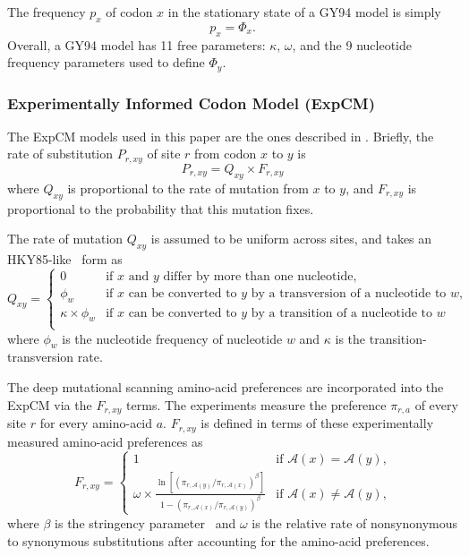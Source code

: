 \documentclass[11pt]{article}
\begin{document}
The frequency $p_x$ of codon $x$ in the stationary state of a GY94 model is simply 
\begin{equation}
\label{eq:px}
p_{x} = \Phi_x.
\end{equation}
Overall, a GY94 model has 11 free parameters: $\kappa$, $\omega$, and the 9 nucleotide frequency parameters used to define $\Phi_y$. 

\subsubsection*{Experimentally Informed Codon Model (ExpCM)}

The ExpCM models used in this paper are the ones described in \citet{bloom2017identification}. 
Briefly, the rate of substitution $P_{r,xy}$ of site $r$ from codon $x$ to $y$ is 
\begin{equation}
\label{eq:ExpCM}
P_{r,xy} = Q_{xy} \times F_{r,xy}
\end{equation}
where $Q_{xy}$ is proportional to the rate of mutation from $x$ to $y$, and $F_{r,xy}$ is proportional to the probability that this mutation fixes.

The rate of mutation $Q_{xy}$ is assumed to be uniform across sites, and takes an HKY85-like~\citep{hasegawa1985dating} form as 
\begin{equation}
\label{eq:Qxy}
   Q_{xy} = \begin{cases}
            0 & \mbox{if $x$ and $y$ differ by more than one nucleotide,} \\
            \phi_w & \mbox{if $x$ can be converted to $y$ by a transversion of a nucleotide to $w$,} \\
            \kappa \times \phi_w & \mbox{if $x$ can be converted to $y$ by a transition of a nucleotide to $w$} \\
            \end{cases}
\end{equation}
where $\phi_w$ is the nucleotide frequency of nucleotide $w$ and $\kappa$ is the transition-transversion rate.


The deep mutational scanning amino-acid preferences are incorporated into the ExpCM via the $F_{r,xy}$ terms.
The experiments measure the preference $\pi_{r,a}$ of every site $r$ for every amino-acid $a$.
$F_{r,xy}$ is defined in terms of these experimentally measured amino-acid preferences as
\begin{equation}
\label{eq:Frxy}
F_{r,xy} = 
\begin{cases}
   1 & \mbox{if $\mathcal{A}\left(x\right) = \mathcal{A}\left(y\right)$,} \\
   \omega \times \frac{\ln\left[\left(\pi_{r,\mathcal{A}\left(y\right)} / \pi_{r,\mathcal{A}\left(x\right)}\right)^{\beta}\right]}{1 - \left(\pi_{r,\mathcal{A}\left(x\right)} / \pi_{r,\mathcal{A}\left(y\right)}\right)^{\beta}} & \mbox{if $\mathcal{A}\left(x\right) \ne \mathcal{A}\left(y\right)$,}
   \end{cases}
\end{equation}
where $\beta$ is the stringency parameter~\citep{bloom2014informed,hilton2017phydms} and $\omega$ is the relative rate of nonsynonymous to synonymous substitutions after accounting for the amino-acid preferences.
\end{document}
